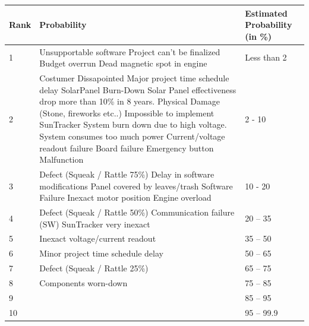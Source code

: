 \documentclass[12pt,a4paper]{report}
\begin{document}
\begin{landscape}

\begin{tabular}{|l|p{12cm}|p{4cm}|}
\hline Rank & Probability & Estimated Probability (in \%) \\ 

\hline 1 & Unsupportable software \newline 
Project can’t be finalized \newline 
Budget overrun Dead magnetic spot in engine  & Less than 2 \\ 

\hline 2 & Costumer Dissapointed\newline
Major project time schedule delay\newline
SolarPanel Burn-Down\newline
Solar Panel effectiveness drop more than 10\% in 8 years.\newline
Physical Damage (Stone, fireworks etc..)\newline
Impossible to implement SunTracker\newline
System burn down due to high voltage.\newline
System consumes too much power\newline
Current/voltage readout failure\newline
Board failure\newline
Emergency button Malfunction & 2 - 10 \\ 

\hline 3 & Defect (Squeak / Rattle 75\%)\newline
Delay in software modifications\newline
Panel covered by leaves/trash\newline
Software Failure\newline
Inexact motor position\newline
Engine overload & 10 - 20 \\

\hline 4 & Defect (Squeak / Rattle 50\%)\newline
Communication failure (SW)\newline
SunTracker very inexact & 20 – 35 \\

\hline 5 & Inexact voltage/current readout & 35 – 50 \\ 

\hline 6 & Minor project time schedule delay & 50 – 65 \\ 

\hline 7 & Defect (Squeak / Rattle 25\%) & 65 – 75 \\ 

\hline 8 & Components worn-down & 75 – 85 \\ 

\hline 9 &  & 85 – 95 \\ 

\hline 10 &  & 95 – 99.9 \\

\hline 

\end{tabular} 
\end{landscape}
\end{document}
